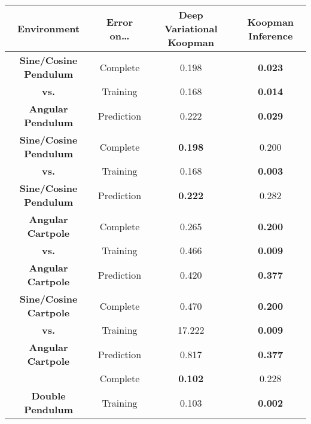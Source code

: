 		\begin{table}
			\centering
			\begin{tabular}{c|c|c|c}
				    \textbf{Environment}      & \textbf{Error on}\dots & \textbf{Deep Variational Koopman} & \textbf{Koopman Inference} \\ \hline
				\textbf{Sine/Cosine Pendulum} &        Complete        &               0.198               &       \textbf{0.023}       \\
				        \textbf{vs.}          &        Training        &               0.168               &       \textbf{0.014}       \\
				  \textbf{Angular Pendulum}   &       Prediction       &               0.222               &       \textbf{0.029}       \\ \hline
				\textbf{Sine/Cosine Pendulum} &        Complete        &          \textbf{0.198}           &           0.200            \\
				        \textbf{vs.}          &        Training        &               0.168               &       \textbf{0.003}       \\
				\textbf{Sine/Cosine Pendulum} &       Prediction       &          \textbf{0.222}           &           0.282            \\ \hline
				  \textbf{Angular Cartpole}   &        Complete        &               0.265               &       \textbf{0.200}       \\
				        \textbf{vs.}          &        Training        &               0.466               &       \textbf{0.009}       \\
				  \textbf{Angular Cartpole}   &       Prediction       &               0.420               &       \textbf{0.377}       \\ \hline
				\textbf{Sine/Cosine Cartpole} &        Complete        &               0.470               &       \textbf{0.200}       \\
				        \textbf{vs.}          &        Training        &              17.222               &       \textbf{0.009}       \\
				  \textbf{Angular Cartpole}   &       Prediction       &               0.817               &       \textbf{0.377}       \\ \hline
				                              &        Complete        &          \textbf{0.102}           &           0.228            \\
				  \textbf{Double Pendulum}    &        Training        &               0.103               &       \textbf{0.002}       \\

\end{tabular}
\end{table}
